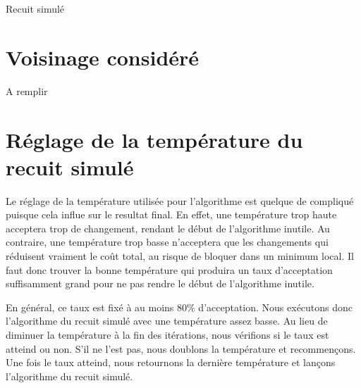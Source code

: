 \documentclass{article}
\begin{document}
\begin{algorithm}[H]
\SetAlgoLined
{}
\caption{Recuit simulé}
\end{algorithm}


\section*{Voisinage considéré}

A remplir

\section*{Réglage de la température du recuit simulé}

Le réglage de la température utilisée pour l'algorithme est quelque de compliqué puisque cela influe sur le resultat final.
En effet, une température trop haute acceptera trop de changement, rendant le début de l'algorithme inutile.
Au contraire, une température trop basse n'acceptera que les changements qui réduisent vraiment le coût total, au risque de bloquer dans un minimum local.
Il faut donc trouver la bonne température qui produira un taux d'acceptation suffisamment grand pour ne pas rendre le début de l'algorithme inutile.

En général, ce taux est fixé à au moins 80\% d'acceptation.
Nous exécutons donc l'algorithme du recuit simulé avec une température assez basse.
Au lieu de diminuer la température à la fin des itérations, nous vérifions si le taux est atteind ou non.
S'il ne l'est pas, nous doublons la température et recommençons.
Une fois le taux atteind, nous retournons la dernière température et lançons l'algorithme du recuit simulé.
\end{document}
